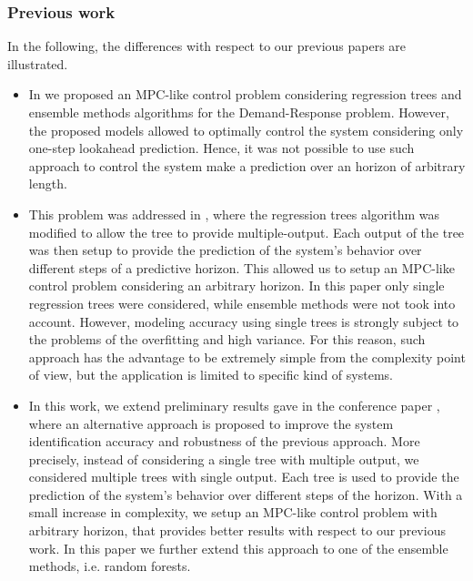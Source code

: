 {\subsubsection{Previous work}\label{SSS:PreviousWork}
In the following, the differences with respect to our previous papers are illustrated.
\begin{itemize}
	\item In \cite{Behl2016} we	proposed an MPC-like control problem considering regression trees and ensemble methods algorithms for the Demand-Response problem. However, the proposed models allowed to optimally control the system considering only one-step lookahead prediction. Hence, it was not possible to use such approach to control the system make a prediction over an horizon of arbitrary length.
	\item This problem was addressed in \cite{Jain2016}, where the regression trees algorithm was modified to allow the tree to provide multiple-output.
	Each output of the tree was then setup to provide the prediction of the system's behavior over different steps of a predictive horizon.
	This allowed us to setup an MPC-like control problem considering an arbitrary horizon.
	In this paper only single regression trees were considered, while ensemble methods were not took into account.
	However, modeling accuracy using single trees is strongly subject to the problems of the overfitting and high variance.
	For this reason, such approach has the advantage to be extremely simple from the complexity point of view, but the application is limited to specific kind of systems.
	\item In this work, we extend preliminary results gave in the conference paper \cite{JainCDC2017}, where an alternative approach is proposed to improve the system identification accuracy and robustness of the previous approach. More precisely, instead of considering a single tree with multiple output, we considered multiple trees with single output. Each tree is used to provide the prediction of the system's behavior over different steps of the horizon. With a small increase in complexity, we setup an MPC-like control problem with arbitrary horizon, that provides better results with respect to our previous work. In this paper we further extend this approach to one of the ensemble methods, i.e. random forests.
\end{itemize}
}

